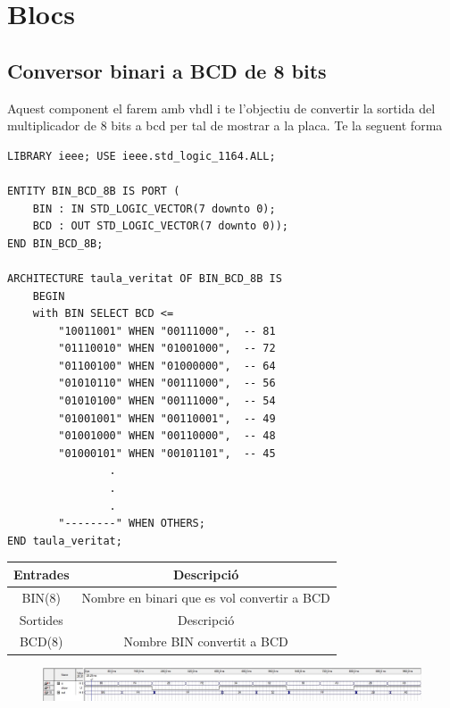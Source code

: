 \documentclass[12pt, a4papre]{article}
\begin{document}
	\newpage
	\section{Blocs}
	
	\subsection{Conversor binari a BCD de 8 bits}
	
	Aquest component el farem amb vhdl i te l'objectiu de convertir la sortida del multiplicador de 8 bits a bcd per tal de mostrar a la placa. Te la seguent forma
	\begin{lstlisting}[style=vhdl, frame=single, basicstyle=\tiny]
LIBRARY ieee; USE ieee.std_logic_1164.ALL;  

ENTITY BIN_BCD_8B IS PORT (   
	BIN : IN STD_LOGIC_VECTOR(7 downto 0);   
	BCD : OUT STD_LOGIC_VECTOR(7 downto 0)); 
END BIN_BCD_8B;  

ARCHITECTURE taula_veritat OF BIN_BCD_8B IS   
	BEGIN 
	with BIN SELECT BCD <=     	
		"10011001" WHEN "00111000",  -- 81     
		"01110010" WHEN "01001000",  -- 72      
		"01100100" WHEN "01000000",  -- 64     
		"01010110" WHEN "00111000",  -- 56     
		"01010100" WHEN "00111000",  -- 54        
		"01001001" WHEN "00110001",  -- 49     
		"01001000" WHEN "00110000",  -- 48     
		"01000101" WHEN "00101101",  -- 45     
				.
				.
				. 
		"--------" WHEN OTHERS;   
END taula_veritat;
\end{lstlisting}

	\begin{table}[h!]
		\centering
		 \begin{tabular}{|c | c|} 
			 \hline
			 Entrades & Descripció\\ [0.5ex] 
			 \hline
			 BIN(8) &  Nombre en binari que es vol convertir a BCD\\ 
			 \hline\hline
			 Sortides & Descripció\\ [0.5ex] 
			 \hline
			 BCD(8) & Nombre BIN convertit a BCD\\ 
			 \hline
		 \end{tabular}
	\end{table}
	
	\begin{figure}[H]
		\begin{center}
		\includegraphics[width=130mm]{selSimulacio.jpeg}
		\end{center}
	\end{figure}
	
\end{document}
